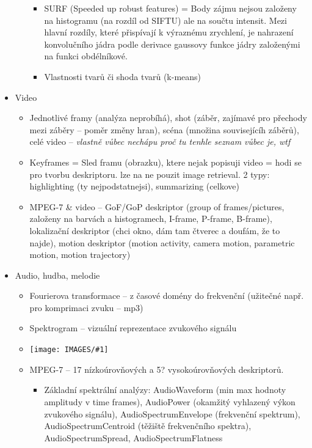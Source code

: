 \documentclass[a4paper,hidelinks]{article}
\newcommand{\myimage}[1] {\texttt{[image: IMAGES/\#1]}}
\begin{document}
\begin{itemize}
\begin{itemize}
\begin{itemize}
            \item SURF (Speeded up robust features) = Body zájmu nejsou založeny na histogramu (na rozdíl od SIFTU) ale na součtu intensit. Mezi hlavní rozdíly, které přispívají k výraznému zrychlení, je nahrazení konvolučního jádra podle derivace gaussovy funkce jádry založenými na funkci obdélníkové.
            \item Vlastnosti tvarů či shoda tvarů (k-means)
        \end{itemize}
    \end{itemize}
    \item Video
    \begin{itemize}
        \item Jednotlivé framy (analýza neprobíhá), shot (záběr, zajímavé pro přechody mezi záběry -- poměr změny hran), scéna (množina souvisejícíh záběrů), celé video -- \textit{vlastně vůbec nechápu proč tu tenhle seznam vůbec je, wtf}
        \item Keyframes = Sled framu (obrazku), ktere nejak popisuji video = hodi se pro tvorbu deskriptoru. lze na ne pouzit image retrieval. 2 typy: highlighting (ty nejpodstatnejsi), summarizing (celkove)
        \item MPEG-7 \& video -- GoF/GoP deskriptor (group of frames/pictures, založeny na barvách a histogramech, I-frame, P-frame, B-frame), lokalizační deskriptor (chci okno, dám tam čtverec a doufám, že to najde), motion deskriptor (motion activity, camera motion, parametric motion, motion trajectory)
    \end{itemize}
    \item Audio, hudba, melodie
    \begin{itemize}
        \item Fourierova transformace -- z časové domény do frekvenční (užitečné např. pro komprimaci zvuku -- mp3)
        \item Spektrogram -- vizuální reprezentace zvukového signálu
        \item \myimage{spektrogram}
        \item MPEG-7 -- 17 nízkoúrovňových a 5? vysokoúrovňových deskriptorů. 
        \begin{itemize}
            \item Základní spektrální analýzy: AudioWaveform (min max hodnoty amplitudy v time frames), AudioPower (okamžitý vyhlazený výkon zvukového signálu), AudioSpectrumEnvelope (frekvenční spektrum), AudioSpectrumCentroid (těžiště frekvenčního spektra), AudioSpectrumSpread, AudioSpectrumFlatness

\end{itemize}
\end{itemize}
\end{itemize}
\end{document}
